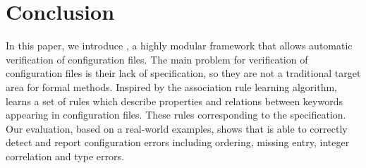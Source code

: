 
\section{Conclusion}

In this paper, we introduce \app, a highly modular framework 
that allows automatic verification of configuration files.
The main problem for verification of configuration files is their lack
of specification, so they are not a traditional target area
for formal methods.
Inspired by the association rule learning algorithm, \app learns 
a set of rules which describe properties and relations between keywords appearing in configuration files. These rules corresponding to the specification.
Our evaluation, based on a real-world  examples, shows that \app is able to
correctly detect and report configuration errors
including ordering, missing entry, integer correlation
and type errors.

